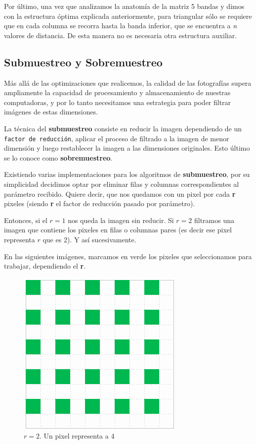 \documentclass[a4paper]{article}
\begin{document}
Por último, una vez que analizamos la anatomía de la matriz 5 bandas y dimos con la estructura óptima explicada anteriormente, para triangular sólo se requiere que en cada columna se recorra hasta la banda inferior, que se encuentra a \textit{n} valores de distancia. De esta manera no es necesaria otra estructura auxiliar.  

\subsection{Submuestreo y Sobremuestreo}

Más allá de las optimizaciones que realicemos, la calidad de las fotografías supera ampliamente la capacidad de procesamiento y almacenamiento de nuestras computadoras, y por lo tanto necesitamos una estrategia para poder filtrar imágenes de estas dimensiones.

La técnica del \textbf{submuestreo} consiste en reducir la imagen dependiendo de un \texttt{factor de reducción}, aplicar el proceso de filtrado a la imagen de menor dimensión y luego restablecer la imagen a las dimensiones originales. Esto último se lo conoce como \textbf{sobremuestreo}.


Existiendo varias implementaciones para los algoritmos de \textbf{submuestreo}, por su simplicidad decidimos optar por eliminar filas y columnas correspondientes al parámetro recibido. Quiere decir, que nos quedamos con un pixel por cada \textbf{r} pixeles (siendo \textbf{r} el factor de reducción pasado por parámetro).

Entonces, si el $r=1$ nos queda la imagen sin reducir. Si $r=2$ filtramos una imagen que contiene los pixeles en filas o columnas pares (es decir ese pixel representa $r$ que es 2). Y así sucesivamente.

En las siguientes imágenes, marcamos en verde los pixeles que seleccionamos para trabajar, dependiendo el \textbf{r}.

\begin{figure}[H]
  \centering
  \includegraphics[scale=0.65]{graficos/Submuestreo-2.png}
  \caption{ $r=2$. Un pixel representa a 4}
\end{figure}
\end{document}
